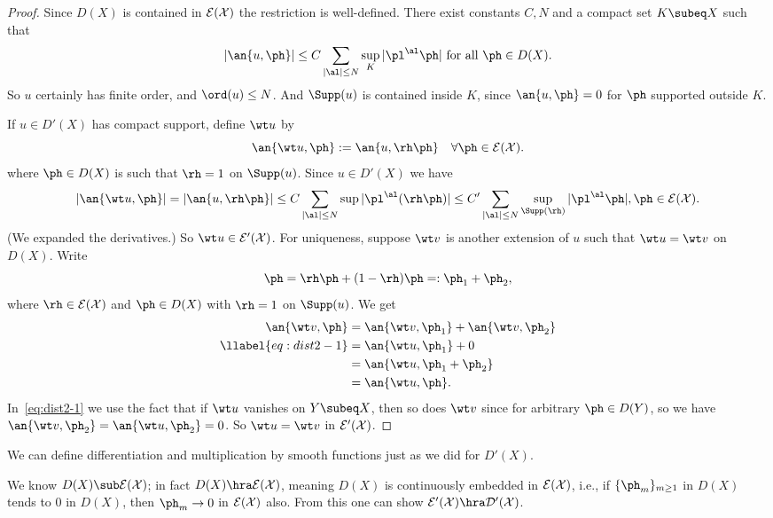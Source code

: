 \begin{proof}
Since $D(X)$ is contained in $\cal E(X)$ the restriction is well-defined. There exist constants $C,N$ and a compact set $K\subeq X$ such that 
\[
|\an{u,\ph}|\le C\sum_{|\al|\le N}\sup_K|\pl^{\al}\ph|\text{ for all }\ph\in D(X).
\]
So $u$ certainly has finite order, and $\ord(u)\le N$. And $\Supp(u)$ is contained inside $K$, since $\an{u,\ph}=0$ for $\ph$ supported outside $K$.

If $u\in D'(X)$ has compact support, define $\wt u$ by \[\an{\wt u,\ph}:=\an{u,\rh \ph}\quad \forall \ph\in \cal E(X).\]
where $\ph\in D(X)$ is such that $\rh=1$ on $\Supp(u)$. Since $u\in D'(X)$ we have
\[
|\an{\wt u,\ph}|=|\an{u,\rh \ph}|\le C\sum_{|\al|\le N} \sup|\pl^{\al} (\rh\ph)| \le C'\sum_{|\al|\le N} \sup_{\Supp(\rh)} |\pl^{\al}\ph|,\ph\in \cal E(X).
\]
(We expanded the derivatives.) So $\wt u\in \cal E'(X)$. For uniqueness, suppose $\wt v$ is another extension of $u$ such that $\wt u=\wt v$ on $D(X)$. Write
\[
\ph=\rh\ph +(1-\rh)\ph=: \ph_1+\ph_2,
\]
where $\rh\in \cal E(X)$ and $\ph\in D(X)$ with $\rh=1$ on $\Supp(u)$. 
We get
\begin{align}
\an{\wt v,\ph}&=\an{\wt v,\ph_1}+\an{\wt v,\ph_2}\\
\llabel{eq:dist2-1}
&=\an{\wt u,\ph_1}+0\\
&=\an{\wt u,\ph_1+\ph_2}\\
&=\an{\wt u,\ph}.
\end{align}
In~\eqref{eq:dist2-1} we use the fact that if $\wt u$ vanishes on $Y\subeq X$, then so does $\wt v$ since for arbitrary $\ph\in D(Y)$, so we have $\an{\wt v,\ph_2}=\an{\wt u,\ph_2}=0$. 
So $\wt u=\wt v$ in $\cal E'(X)$.
\end{proof}
We can define differentiation and multiplication by smooth functions just as we did for $D'(X)$. 

\begin{rem}
We know $D(X)\sub \cal E(X)$; in fact $D(X)\hra \cal E(X)$, meaning $D(X)$ is continuously embedded in $\cal E(X)$, i.e., if $\{\ph_m\}_{m\ge 1}$ in $D(X)$ tends to 0 in $D(X)$, then $\ph_m\to 0$ in $\cal E(X)$ also. From this one can show $\cal E'(X)\hra D'(X)$.
\end{rem}

